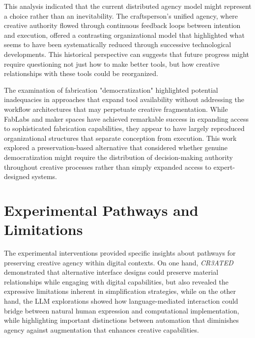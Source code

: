 \vspace{0.5cm}

This analysis indicated that the current distributed agency model might represent a choice rather than an inevitability. The craftsperson's unified agency, where creative authority flowed through continuous feedback loops between intention and execution, offered a contrasting organizational model that highlighted what seems to have been systematically reduced through successive technological developments. This historical perspective can suggests that future progress might require questioning not just how to make better tools, but how creative relationships with these tools could be reorganized.

\vspace{0.5cm}

The examination of fabrication "democratization" highlighted potential inadequacies in approaches that expand tool availability without addressing the workflow architectures that may perpetuate creative fragmentation. While FabLabs and maker spaces have achieved remarkable success in expanding access to sophisticated fabrication capabilities, they appear to have largely reproduced organizational structures that separate conception from execution. This work explored a preservation-based alternative that considered whether genuine democratization might require the distribution of decision-making authority throughout creative processes rather than simply expanded access to expert-designed systems.

\section{Experimental Pathways and Limitations}

The experimental interventions provided specific insights about pathways for preserving creative agency within digital contexts. On one hand, \textit{CR3ATED} demonstrated that alternative interface designs could preserve material relationships while engaging with digital capabilities, but also revealed the expressive limitations inherent in simplification strategies, while on the other hand, the LLM explorations showed how language-mediated interaction could bridge between natural human expression and computational implementation, while highlighting important distinctions between automation that diminishes agency against augmentation that enhances creative capabilities.

\vspace{0.5cm}

